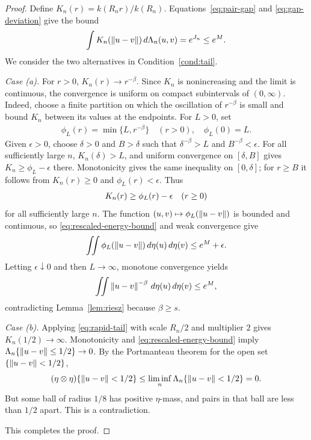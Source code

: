 \begin{proof}
Define $K_n(r)=k(R_nr)/k(R_n)$. Equations~\eqref{eq:pair-gap} and \eqref{eq:gap-deviation} give the bound
\begin{align}\label{eq:rescaled-energy-bound}
\int K_n(\left\lVert u-v\right\rVert)\,d\Lambda_n(u,v)=e^{J_n}\leq e^M.
\end{align}
We consider the two alternatives in Condition~\ref{cond:tail}.

\emph{Case (a).} For $r>0$, $K_n(r)\to r^{-\beta}$. Since $K_n$ is nonincreasing and the limit is continuous, the convergence is uniform on compact subintervals of $(0,\infty)$. Indeed, choose a finite partition on which the oscillation of $r^{-\beta}$ is small and bound $K_n$ between its values at the endpoints. For $L>0$, set
\begin{align}
\phi_L(r)=\min\{L,r^{-\beta}\}\quad(r>0),\quad \phi_L(0)=L.
\end{align}
Given $\epsilon>0$, choose $\delta>0$ and $B>\delta$ such that $\delta^{-\beta}>L$ and $B^{-\beta}<\epsilon$. For all sufficiently large $n$, $K_n(\delta)>L$, and uniform convergence on $[\delta,B]$ gives $K_n\geq\phi_L-\epsilon$ there. Monotonicity gives the same inequality on $[0,\delta]$; for $r\geq B$ it follows from $K_n(r)\geq0$ and $\phi_L(r)<\epsilon$. Thus
\begin{align}
K_n(r)\geq\phi_L(r)-\epsilon\quad(r\geq0)\notag
\end{align}
for all sufficiently large $n$. The function $(u,v)\mapsto\phi_L(\left\lVert u-v\right\rVert)$ is bounded and continuous, so \eqref{eq:rescaled-energy-bound} and weak convergence give
\begin{align}
\iint\phi_L(\left\lVert u-v\right\rVert)\,d\eta(u)\,d\eta(v)\leq e^M+\epsilon.\notag
\end{align}
Letting $\epsilon\downarrow0$ and then $L\to\infty$, monotone convergence yields
\begin{align}
\iint\left\lVert u-v\right\rVert^{-\beta}\,d\eta(u)\,d\eta(v)\leq e^M,
\end{align}
contradicting Lemma~\ref{lem:riesz} because $\beta\geq s$.

\emph{Case (b).} Applying \eqref{eq:rapid-tail} with scale $R_n/2$ and multiplier $2$ gives $K_n(1/2)\to\infty$. Monotonicity and \eqref{eq:rescaled-energy-bound} imply
$\Lambda_n\{\left\lVert u-v\right\rVert\leq1/2\}\to0$.
By the Portmanteau theorem for the open set $\{\left\lVert u-v\right\rVert<1/2\}$,
\begin{align}
(\eta\otimes\eta)\{\left\lVert u-v\right\rVert<1/2\}
\leq\liminf_n\Lambda_n\{\left\lVert u-v\right\rVert<1/2\}=0.\notag
\end{align}
But some ball of radius $1/8$ has positive $\eta$-mass, and pairs in that ball are less than $1/2$ apart. This is a contradiction.

This completes the proof.
\end{proof}

